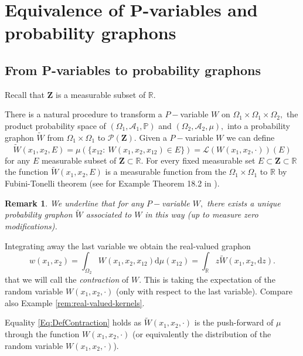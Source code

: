 \documentclass[11pt]{article}
\newtheorem{remark}[theorem]{Remark}
\def\R{\mathbb{R}}
\def\P{\mathbb{P}}
\newcommand{\cA}{{\mathcal A}}  %
\newcommand{\Space}{\mathbf{Z}}
\renewcommand{\P}{\mathbb{P}}
\begin{document}
\section{Equivalence of P-variables and probability graphons}\label{Sec4:EquivPsetsProbGraphon}

\subsection{From P-variables to probability graphons}

Recall that $\Space$ is a measurable subset of $\R.$

There is a natural procedure to transform a $P-$variable $W$ on $\Omega_1\times \Omega_1 \times \Omega_2,$ the product probability space of $(\Omega_1,\cA_1,\P)$ and $(\Omega_2,\cA_2,\mu),$ into a probability graphon $\widetilde W$ from $\Omega_1 \times \Omega_1$ to $\mathcal{P}(\Space)$. 
Given a $P-$variable $W$ we can define
$$
\widetilde W (x_1,x_2,E)=\mu(\{x_{12}: \ W(x_1,x_2,x_{12})\in E\})=\mathcal{L}(W(x_1,x_2,\cdot))(E)
$$
for any $E$ measurable subset of $\Space\subset\R.$
For every fixed measurable set $E\subset \Space \subset\R$ the function $\widetilde W (x_1,x_2,E)$ is a measurable function from the $\Omega_1\times \Omega_1$ to $\R$ by Fubini-Tonelli theorem (see for Example Theorem 18.2 in \cite{Bill86}).

\begin{remark}
    We underline that for any $P-$variable $W,$ there exists a unique probability graphon $\widetilde W$ associated to $W$ in this way (up to measure zero modifications). 
\end{remark}

Integrating away the last variable we obtain the real-valued graphon
\begin{equation}\label{Eq:DefContraction}
w(x_1,x_2)=\int_{\Omega_2}W(x_1,x_2,x_{12})\mathrm{d}\mu(x_{12})=\int_{\mathbb{R}}z\widetilde W(x_1,x_2,\mathrm{d}z).
\end{equation}
that we will call the \emph{contraction} of $W.$ This is taking the expectation of the random variable $W(x_1,x_2,\cdot)$ (only with respect to the last variable). Compare also Example \ref{rem:real-valued-kernels}.

Equality \eqref{Eq:DefContraction} holds as $\widetilde W(x_1,x_2,\cdot)$ is the push-forward of $\mu$ through the function $W(x_1,x_2,\cdot)$ (or equivalently the distribution of the random variable $W(x_1,x_2,\cdot)$). 
\end{document}

